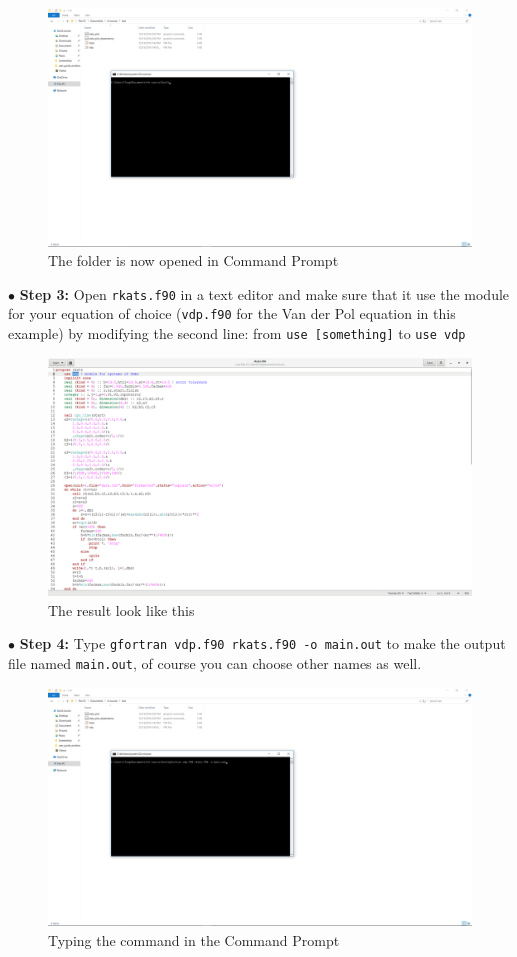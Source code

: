 \documentclass{article}
\begin{document}
	\begin{figure}[H]
		\centering	\includegraphics[width=15cm]{fig3}
		\caption{The folder is now opened in Command Prompt}
	\end{figure}
	\noindent$\bullet$ \textbf{Step 3:} Open \texttt{rkats.f90} in a text editor and make sure that it use the module for your equation of choice (\texttt{vdp.f90} for the Van der Pol equation in this example) by modifying the second line: from \texttt{use [something]} to \texttt{use vdp}
	\begin{figure}[H]
		\centering	\includegraphics[width=15cm]{fig4}
		\caption{The result look like this}
	\end{figure}
	\noindent$\bullet$ \textbf{Step 4:} Type \texttt{gfortran vdp.f90 rkats.f90 -o main.out} to make the output file named \texttt{main.out}, of course you can choose other names as well.
	\begin{figure}[H]
		\centering	\includegraphics[width=15cm]{fig5}
		\caption{Typing the command in the Command Prompt}
	\end{figure}
\end{document}
